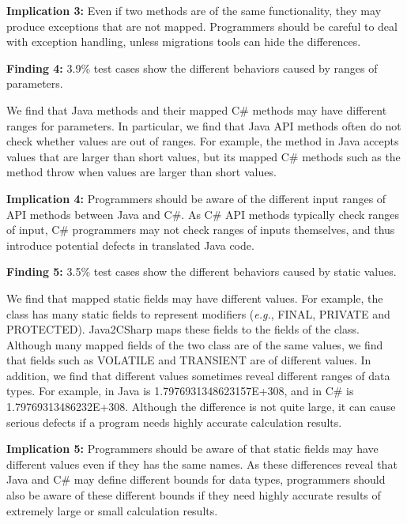 \textbf{Implication 3:} Even if two methods are of the same functionality, they may produce exceptions that are not mapped. Programmers should be careful to deal with exception handling, unless migrations tools can hide the differences.

\textbf{Finding 4:} 3.9\% test cases show the different behaviors caused by ranges of parameters.

We find that Java methods and their mapped C\# methods may have different ranges for parameters. In particular, we find that Java API methods often do not check whether values are out of ranges. For example, the  method in Java accepts values that are larger than short values, but its mapped C\# methods such as the  method throw  when values are larger than short values.

\textbf{Implication 4:} Programmers should be aware of the different input ranges of API methods between Java and C\#. As C\# API methods typically check ranges of input, C\# programmers may not check ranges of inputs themselves, and thus introduce potential defects in translated Java code.

\textbf{Finding 5:} 3.5\% test cases show the different behaviors caused by static values.

We find that mapped static fields may have different values. For example, the  class has many static fields to represent modifiers (\emph{e.g.}, FINAL, PRIVATE and PROTECTED). Java2CSharp maps these fields to the fields of the  class. Although many mapped fields of the two class are of the same values, we find that fields such as VOLATILE and TRANSIENT are of different values. In addition, we find that different values sometimes reveal different ranges of data types. For example,  in Java is 1.7976931348623157E+308, and  in C\# is 1.79769313486232E+308. Although the difference is not quite large, it can cause serious defects if a program needs highly accurate calculation results.

\textbf{Implication 5:} Programmers should be aware of that static fields may have different values even if they has the same names. As these differences reveal that Java and C\# may define different bounds for data types, programmers should also be aware of these different bounds if they need highly accurate results of extremely large or small calculation results.

